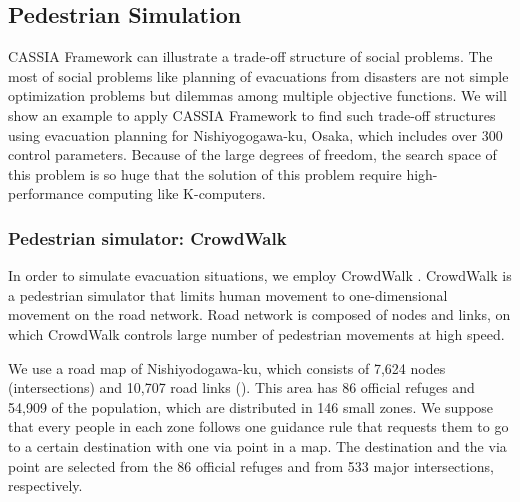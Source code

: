 \subsection{Pedestrian Simulation}
\label{ss:Pedestrian Simulation}
CASSIA Framework can illustrate a trade-off structure of social problems.
The most of social problems like planning of evacuations from disasters
are not simple optimization problems but dilemmas among multiple
objective functions.
We will show an example to apply CASSIA Framework to find
such trade-off structures using evacuation planning for Nishiyogogawa-ku, Osaka,
which includes over 300 control parameters\cite{Noda2018b}.
Because of the large degrees of freedom,
the search space of this problem is so huge
that the solution of this problem require high-performance
computing like K-computers.


\subsubsection{Pedestrian simulator: CrowdWalk}
\label{sss:CrowdWalk}
In order to simulate evacuation situations, we employ CrowdWalk
\cite{yamashita:2013,yamashita:2014a}.
CrowdWalk is a pedestrian simulator that limits human movement 
to one-dimensional movement on the road network. 
Road network is composed of nodes and links,
on which CrowdWalk controls 
large number of pedestrian movements at high speed.

We use a road map of Nishiyodogawa-ku,
which consists of 7,624 nodes (intersections) and 10,707 road links
().
This area has 86 official refuges
and 54,909 of the population,
which are distributed in 146 small zones.
We suppose that every people in each zone follows one guidance rule
that requests them to go to a certain destination with one via point in a map.
The destination and the via point are selected from the 86 official refuges
and from 533 major intersections, respectively.

